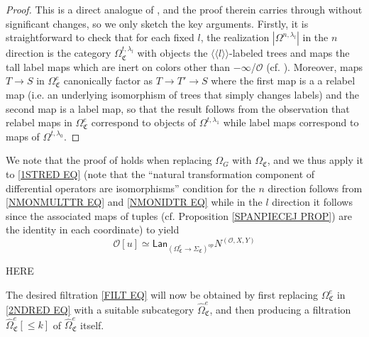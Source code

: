 \documentclass[a4paper,10pt
,draft
]{article}%
\numberwithin{equation}{section}
\numberwithin{figure}{section}
\theoremstyle{definition} %
\renewcommand{\O}{\ensuremath{\mathcal O}}
\newcommand{\1}{\ensuremath{\mathbbm 1}}%
\begin{document}
\begin{proof}
This is a direct analogue of \cite[Prop. 5.41]{BP_geo}, and the proof therein carries through without significant changes, so we only sketch the key arguments.
Firstly, it is straightforward to check that for each fixed $l$,
the realization $|\Omega^{n,\lambda_l}|$
in the $n$ direction is the category 
$\Omega^{t,\lambda_l}_{\mathfrak{C}}$
with objects the $\langle \langle l \rangle \rangle$-labeled trees and  maps the tall label maps which are inert on colors other than $-\infty$/$\O$ (cf. \cite[Rem. 5.36]{BP_geo}).
Moreover, maps 
$T \to S$
in 
$\Omega^e_{\mathfrak{C}}$
canonically factor 
as
$T \to T' \to S$
where the first map is a a relabel map (i.e. an underlying isomorphism of trees that simply changes labels) and the second map is a label map, 
so that the result follows from the observation that relabel maps in 
$\Omega^e_{\mathfrak{C}}$
correspond to objects of  
$\Omega^{t,\lambda_1}$
while label maps correspond to maps of
$\Omega^{t,\lambda_0}$.
\end{proof}



We note that the proof of \cite[Prop 5.37]{BP_geo} %
holds when replacing $\Omega_G$ with $\Omega_{\mathfrak C}$,
and we thus 
apply it to
\eqref{1STRED EQ}
(note that the ``natural transformation component of differential operators are isomorphisms'' condition for the $n$ direction follows from \eqref{NMONMULTTR EQ} and \eqref{NMONIDTR EQ}
while in the $l$ direction it follows since the associated maps of tuples (cf. Proposition \ref{SPANPIECEJ PROP}) are the identity in each coordinate)
to yield
\begin{equation}\label{2NDRED EQ}
\O[u] \simeq
	\mathsf{Lan}_{\left(\Omega_{\mathfrak C}^{e} \to
	\Sigma_{\mathfrak C}\right)^{op}} N^{(\O,X,Y)}
\end{equation}

{\color{red} HERE}

The desired filtration \eqref{FILT EQ} will now be obtained by
first replacing $\Omega_{\mathfrak C}^e$ in \eqref{2NDRED EQ} with a suitable subcategory $\widehat{\Omega}_{\mathfrak C}^{e}$,
and then producing a filtration
$\widehat{\Omega}_{\mathfrak C}^{e}[\leq k]$
of 
$\widehat{\Omega}_{\mathfrak C}^{e}$ itself.

\end{document}
